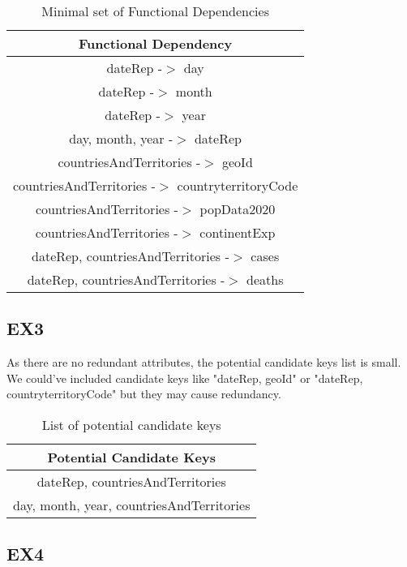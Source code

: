 \documentclass[]{article}
\begin{document}
\begin{table}[h]
\centering
\begin{tabular}{ |c| }
    \hline
    \textbf{Functional Dependency} \\
    \hline
        dateRep -$>$ day\\
        dateRep -$>$ month\\
        dateRep -$>$ year\\
        day, month, year -$>$ dateRep\\
        countriesAndTerritories -$>$ geoId\\
        countriesAndTerritories -$>$ countryterritoryCode\\
        countriesAndTerritories -$>$ popData2020\\
        countriesAndTerritories -$>$ continentExp\\
        dateRep, countriesAndTerritories -$>$ cases\\
        dateRep, countriesAndTerritories -$>$ deaths\\
        
    \hline
\end{tabular}
\caption{Minimal set of Functional Dependencies}
\end{table}

\subsection{EX3}

As there are no redundant attributes, the potential candidate keys list is small. We could've included candidate keys like "dateRep, geoId" or "dateRep, countryterritoryCode" but they may cause redundancy.

\begin{table}[h]
\centering
\begin{tabular}{ |c| }
        \hline
        \textbf{Potential Candidate Keys} \\
        \hline
            dateRep, countriesAndTerritories\\
            day, month, year, countriesAndTerritories\\
        \hline
    \end{tabular}
    \caption{List of potential candidate keys}
    \end{table}

\subsection{EX4}
\end{document}
